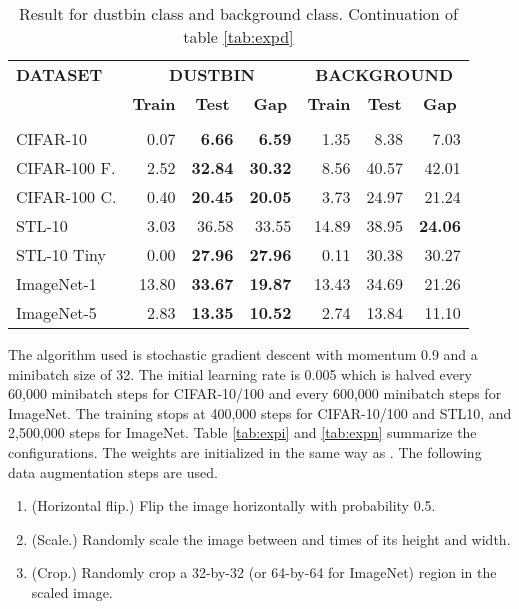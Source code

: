 \documentclass[letterpaper]{article}
\begin{document}
\begin{table}[h]
  \caption{Result for dustbin class and background class. Continuation of table \ref{tab:expd}}
  \label{tab:expr}
  \begin{center}
    \addtolength{\tabcolsep}{-3pt}
    \begin{tabular}{lrrrrrr}
      \textbf{DATASET}  & \multicolumn{3}{c}{\textbf{DUSTBIN}} & \multicolumn{3}{c}{\textbf{BACKGROUND}} \\
      & \multicolumn{1}{c}{\small\textbf{Train}} & \multicolumn{1}{c}{\small\textbf{Test}} & \multicolumn{1}{c}{\small\textbf{Gap}} & \multicolumn{1}{c}{\small\textbf{Train}} & \multicolumn{1}{c}{\small\textbf{Test}} & \multicolumn{1}{c}{\small\textbf{Gap}} \\
      \hline \\
      CIFAR-10 & 0.07 & \textbf{6.66} & \textbf{6.59} & 1.35 & 8.38 & 7.03 \\
      CIFAR-100 F.  & 2.52 & \textbf{32.84} & \textbf{30.32} & 8.56 & 40.57 & 42.01 \\
      CIFAR-100 C.  & 0.40 & \textbf{20.45} & \textbf{20.05} & 3.73 & 24.97 & 21.24 \\
      STL-10 & 3.03 & 36.58 & 33.55 & 14.89 & 38.95 & \textbf{24.06} \\
      STL-10 Tiny  & 0.00 & \textbf{27.96} & \textbf{27.96} & 0.11 & 30.38 & 30.27 \\
      ImageNet-1 & 13.80 & \textbf{33.67} & \textbf{19.87} & 13.43 & 34.69 & 21.26 \\
      ImageNet-5 & 2.83 & \textbf{13.35} & \textbf{10.52} & 2.74 & 13.84 & 11.10 \\
    \end{tabular}
    \addtolength{\tabcolsep}{4pt}
    \vspace{-10pt}
  \end{center}
\end{table}

The algorithm used is stochastic gradient descent with momentum \cite{P64} \cite{SMDH13} 0.9 and a minibatch size of 32. The initial learning rate is 0.005 which is halved every 60,000 minibatch steps for CIFAR-10/100 and every 600,000 minibatch steps for ImageNet. The training stops at 400,000 steps for CIFAR-10/100 and STL10, and 2,500,000 steps for ImageNet. Table \ref{tab:expi} and \ref{tab:expn} summarize the configurations. The weights are initialized in the same way as \cite{HZRS15}. The following data augmentation steps are used.

\begin{enumerate}
  \setlength{\itemsep}{2pt}
\item (Horizontal flip.) Flip the image horizontally with probability 0.5.
\item (Scale.) Randomly scale the image between  and  times of its height and width.
\item (Crop.) Randomly crop a 32-by-32 (or 64-by-64 for ImageNet) region in the scaled image.
\end{enumerate}
\end{document}
